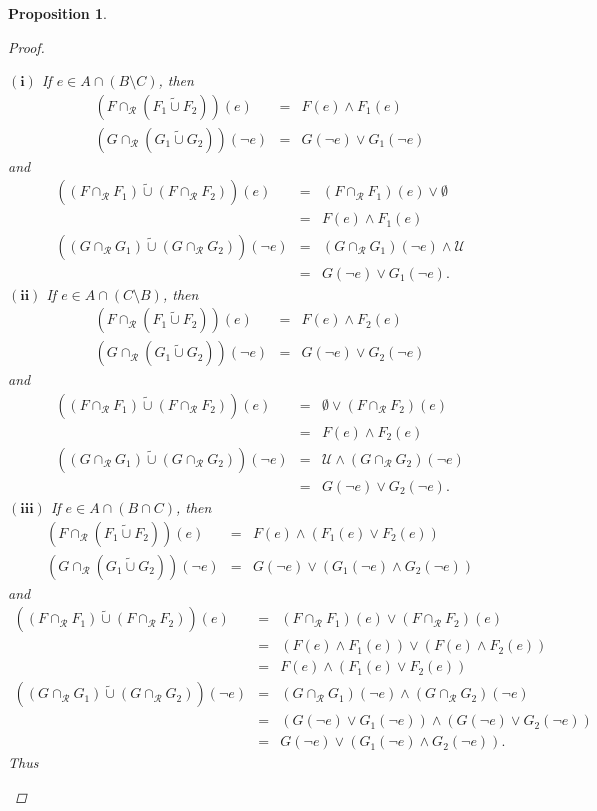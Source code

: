 \documentclass{amsart}
\theoremstyle{plain}
\newtheorem{proposition}{Proposition}
\numberwithin{equation}{section}
\begin{document}
\begin{proposition}
\begin{proof}
\begin{enumerate}
$\mathbf{(i)}$ If $e\in A\cap (B\setminus C)$, then 
\begin{eqnarray*}
(F\cap _{\mathcal{R}}(F_{1}\tilde{\cup}F_{2}))(e) &=&F(e)\wedge F_{1}(e) \\
(G\cap _{\mathcal{R}}(G_{1}\tilde{\cup}G_{2}))(\lnot e) &=&G(\lnot e)\vee
G_{1}(\lnot e)
\end{eqnarray*}and 
\begin{eqnarray*}
((F\cap _{\mathcal{R}}F_{1})\tilde{\cup}(F\cap _{\mathcal{R}}F_{2}))(e)
&=&(F\cap _{\mathcal{R}}F_{1})(e)\vee \emptyset \\
&=&F(e)\wedge F_{1}(e) \\
((G\cap _{\mathcal{R}}G_{1})\tilde{\cup}(G\cap _{\mathcal{R}}G_{2}))(\lnot
e) &=&(G\cap _{\mathcal{R}}G_{1})(\lnot e)\wedge \mathcal{U} \\
&=&G(\lnot e)\vee G_{1}(\lnot e)\text{.}
\end{eqnarray*}$\mathbf{(ii)}$ If $e\in A\cap (C\setminus B)$, then 
\begin{eqnarray*}
(F\cap _{\mathcal{R}}(F_{1}\tilde{\cup}F_{2}))(e) &=&F(e)\wedge F_{2}(e) \\
(G\cap _{\mathcal{R}}(G_{1}\tilde{\cup}G_{2}))(\lnot e) &=&G(\lnot e)\vee
G_{2}(\lnot e)
\end{eqnarray*}and 
\begin{eqnarray*}
((F\cap _{\mathcal{R}}F_{1})\tilde{\cup}(F\cap _{\mathcal{R}}F_{2}))(e)
&=&\emptyset \vee (F\cap _{\mathcal{R}}F_{2})(e) \\
&=&F(e)\wedge F_{2}(e) \\
((G\cap _{\mathcal{R}}G_{1})\tilde{\cup}(G\cap _{\mathcal{R}}G_{2}))(\lnot
e) &=&\mathcal{U}\wedge (G\cap _{\mathcal{R}}G_{2})(\lnot e) \\
&=&G(\lnot e)\vee G_{2}(\lnot e)\text{.}
\end{eqnarray*}$\mathbf{(iii)}$ If $e\in A\cap (B\cap C)$, then 
\begin{eqnarray*}
(F\cap _{\mathcal{R}}(F_{1}\tilde{\cup}F_{2}))(e) &=&F(e)\wedge
(F_{1}(e)\vee F_{2}(e)) \\
(G\cap _{\mathcal{R}}(G_{1}\tilde{\cup}G_{2}))(\lnot e) &=&G(\lnot e)\vee
(G_{1}(\lnot e)\wedge G_{2}(\lnot e))
\end{eqnarray*}and 
\begin{eqnarray*}
((F\cap _{\mathcal{R}}F_{1})\tilde{\cup}(F\cap _{\mathcal{R}}F_{2}))(e)
&=&(F\cap _{\mathcal{R}}F_{1})(e)\vee (F\cap _{\mathcal{R}}F_{2})(e) \\
&=&(F(e)\wedge F_{1}(e))\vee (F(e)\wedge F_{2}(e)) \\
&=&F(e)\wedge (F_{1}(e)\vee F_{2}(e)) \\
((G\cap _{\mathcal{R}}G_{1})\tilde{\cup}(G\cap _{\mathcal{R}}G_{2}))(\lnot
e) &=&(G\cap _{\mathcal{R}}G_{1})(\lnot e)\wedge (G\cap _{\mathcal{R}}G_{2})(\lnot e) \\
&=&(G(\lnot e)\vee G_{1}(\lnot e))\wedge (G(\lnot e)\vee G_{2}(\lnot e)) \\
&=&G(\lnot e)\vee (G_{1}(\lnot e)\wedge G_{2}(\lnot e))\text{.}
\end{eqnarray*}Thus


\end{enumerate}
\end{proof}
\end{proposition}
\end{document}
